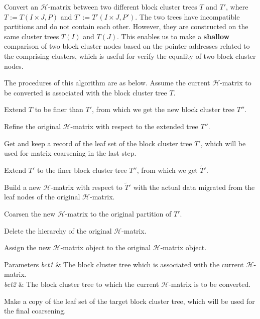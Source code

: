 Convert an $\mathcal{H}$-\/matrix between two different block cluster trees $T$ and $T'$, where $T := T(I \times J, P)$ and $T' := T'(I \times J, P')$. The two trees have incompatible partitions and do not contain each other. However, they are constructed on the same cluster trees $T(I)$ and $T(J)$. This enables us to make a {\bfseries shallow} comparison of two block cluster nodes based on the pointer addresses related to the comprising clusters, which is useful for verify the equality of two block cluster nodes.

The procedures of this algorithm are as below. Assume the current $\mathcal{H}$-\/matrix to be converted is associated with the block cluster tree $T$.


\begin{DoxyEnumerate}
\item Extend $T$ to be finer than $T'$, from which we get the new block cluster tree $T''$.
\item Refine the original $\mathcal{H}$-\/matrix with respect to the extended tree $T''$.
\item Get and keep a record of the leaf set of the block cluster tree $T'$, which will be used for matrix coarsening in the last step.
\item Extend $T'$ to the finer block cluster tree $T''$, from which we get $\tilde{T}'$.
\item Build a new $\mathcal{H}$-\/matrix with respect to $\tilde{T}'$ with the actual data migrated from the leaf nodes of the original $\mathcal{H}$-\/matrix.
\item Coarsen the new $\mathcal{H}$-\/matrix to the original partition of $T'$.
\item Delete the hierarchy of the original $\mathcal{H}$-\/matrix.
\item Assign the new $\mathcal{H}$-\/matrix object to the original $\mathcal{H}$-\/matrix object.
\end{DoxyEnumerate}


\begin{DoxyParams}{Parameters}
{\em bct1} & The block cluster tree which is associated with the current $\mathcal{H}$-\/matrix. \\
\hline
{\em bct2} & The block cluster tree to which the current $\mathcal{H}$-\/matrix is to be converted. \\
\hline
\end{DoxyParams}
Make a copy of the leaf set of the target block cluster tree, which will be used for the final coarsening.

